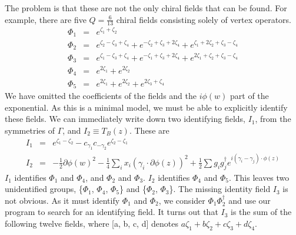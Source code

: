 \documentclass[a4paper,a4paper]{article}
\begin{document}
The problem is that these are not the only chiral fields that can be found.
For example, there are five $Q=\frac{6}{13}$ chiral fields consisting solely of vertex operators. 
\begin{eqnarray}
\Phi_1 & = & e^{\zeta_1 + \zeta_2} \nonumber \\
\Phi_2 & = & e^{\zeta_2 - \zeta_3 + \zeta_4} + e^{-\zeta_2 + \zeta_3 + 2\zeta_4} + e^{\zeta_1 + 2\zeta_2 + \zeta_3 - \zeta_4} \nonumber \\
\Phi_3 & = & e^{\zeta_1 - \zeta_3 + \zeta_4} + e^{-\zeta_1 + \zeta_3 + 2\zeta_4} + e^{2\zeta_1 + \zeta_2 + \zeta_3 - \zeta_4} \nonumber \\
\Phi_4 & = & e^{2\zeta_1} + e^{2\zeta_2} \nonumber \\
\Phi_5 & = & e^{2\zeta_1} + e^{2\zeta_2} + e^{2\zeta_3 + \zeta_4} \nonumber
\end{eqnarray}
We have omitted the coefficients of the fields and the $i\phi(w)$ part of the exponential.
As this is a minimal model, we must be able to explicitly identify these fields.
We can immediately write down two identifying fields, $I_1$, from the symmetries of $\Gamma$, and $I_2 \equiv T_B(z)$.
These are
\begin{eqnarray}
I_1 & = & e^{\zeta_1 - \zeta_2} - c_{\gamma_1}c_{-\gamma_2}e^{\zeta_2 - \zeta_1} \\
I_2 & = & -\frac{1}{2}\partial\phi(w)^2 -\frac{1}{4} \sum_i x_i ( \gamma_i \cdot \partial\phi(z) ) ^2 + \frac{1}{2} 
\sum g_i g_j^{\dagger} e^{i(\gamma_i - \gamma_j)\cdot\phi(z)}
\end{eqnarray}
$I_1$ identifies $\Phi_1$ and $\Phi_4$, and $\Phi_2$ and $\Phi_3$. 
$I_2$ identifies $\Phi_4$ and $\Phi_5$. This leaves two unidentified groups, \{$\Phi_1$, $\Phi_4$, $\Phi_5$\} and \{$\Phi_2$, $\Phi_3$\}.
The missing identity field $I_3$ is not obvious. As it must identify $\Phi_1$ and $\Phi_2$, we consider $\Phi_1 \Phi_2^{\dagger}$ and use our program 
to search for an identifying field. It turns out that 
$I_3$ is the sum of the following twelve fields, where [a, b, c, d] denotes $a\zeta_1 + b\zeta_2 + c\zeta_3 + d\zeta_4$. 
\end{document}
